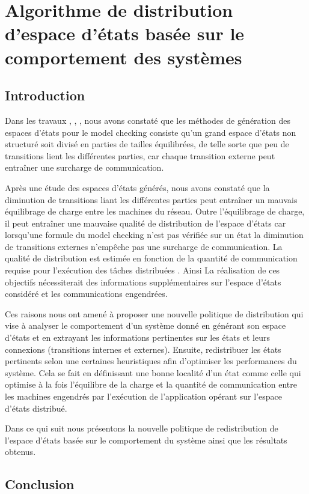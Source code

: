 \chapter{Algorithme de distribution d’espace d’états basée sur le comportement des systèmes}
	\minitoc
	\newpage

 \section{Introduction}
Dans les travaux \citep{Saidouni2012}, \citep{TabibSaidouni2016}, \citep{BENSETIRA2017}, nous avons constaté que les méthodes de génération des espaces d’états pour le model checking consiste  qu’un grand espace d'états non structuré soit divisé en parties de tailles équilibrées, de telle sorte que peu de transitions lient les différentes  parties, car chaque transition externe peut entraîner une surcharge de communication.

Après une étude des espaces d'états générés, nous avons constaté que la diminution de transitions liant les différentes parties peut entraîner un mauvais équilibrage de charge entre les machines du réseau. Outre l’équilibrage de charge, il peut entraîner une mauvaise qualité de distribution de l'espace d'états car lorsqu'une formule du model checking n'est pas vérifiée sur un état la diminution de transitions externes n'empêche pas une surcharge de communication. La qualité de distribution est estimée en fonction de la quantité de communication requise pour l’exécution des tâches distribuées \citep{EzekielLuttgen2008}. Ainsi La réalisation de ces objectifs nécessiterait des informations supplémentaires sur l’espace d’états considéré et les communications engendrées. 

Ces raisons nous ont amené à proposer une nouvelle politique de distribution qui vise à analyser le comportement d’un système donné en générant son espace d’états et en extrayant les informations pertinentes sur les états et leurs connexions (transitions internes et externes). Ensuite, redistribuer les états pertinents selon une certaines heuristiques afin d’optimiser les performances du système. Cela se fait en définissant une bonne localité d’un état comme celle qui optimise à la fois l’équilibre de la charge et la quantité de communication entre les machines engendrés par l’exécution de l’application opérant sur l’espace d’états distribué.
 
Dans ce qui suit nous présentons la nouvelle politique de redistribution de l’espace d’états basée sur le comportement du système ainsi que les résultats obtenus. 
 
 



\section{Conclusion}